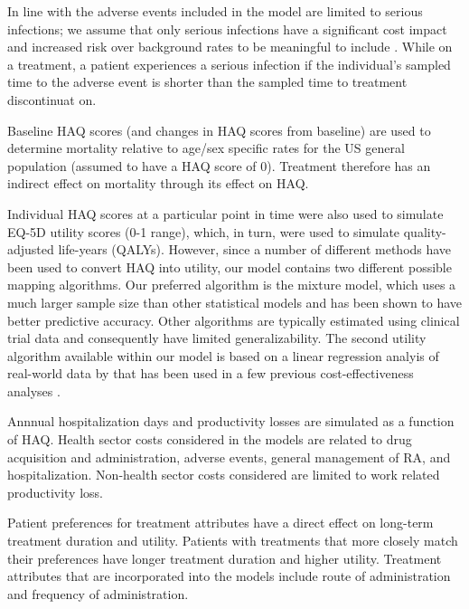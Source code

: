 \documentclass[11pt,final,fleqn]{article}\usepackage[]{graphicx}\usepackage[]{color}
\theoremstyle{plain}
\begin{document}
In line with \citet{stevenson2016adalimumab} the adverse events included in the model are limited to serious infections; we assume that only serious infections have a significant cost impact and increased risk over background rates to be meaningful to include \citep{ramiro2017safety}. While on a treatment, a patient experiences a serious infection if the individual's sampled time to the adverse event is shorter than the sampled time to treatment discontinuat on.

Baseline HAQ scores (and changes in HAQ scores from baseline) are used to determine mortality relative to age/sex specific rates for the US general population (assumed to have a HAQ score of 0). Treatment therefore has an indirect effect on mortality through its effect on HAQ. 

Individual HAQ scores at a particular point in time were also used to simulate EQ-5D utility scores (0-1 range), which, in turn, were used to simulate quality-adjusted life-years (QALYs). However, since a number of different methods have been used to convert HAQ into utility, our model contains two different possible mapping algorithms. Our preferred algorithm is the \citet{alava2013relationship} mixture model, which uses a much larger sample size than other statistical models and has been shown to have better predictive accuracy. Other algorithms are typically estimated using clinical trial data \citep[e.g.][]{carlson2015economic, stephens2015modelling} and consequently have limited generalizability. The second utility algorithm available within our model is based on a linear regression analyis of real-world data by \citet{wailoo2006modeling} that has been used in a few previous cost-effectiveness analyses \citep[e.g.][]{wailoo2008biologic, icer2017tim}. 

Annnual hospitalization days and productivity losses are simulated as a function of HAQ. Health sector costs considered in the models are related to drug acquisition and administration, adverse events, general management of RA, and hospitalization. Non-health sector costs considered are limited to work related productivity loss.

Patient preferences for treatment attributes have a direct effect on long-term treatment duration and utility. Patients with treatments that more closely match their preferences have longer treatment duration and higher utility. Treatment attributes that are incorporated into the models include route of administration and frequency of administration.
\end{document}
